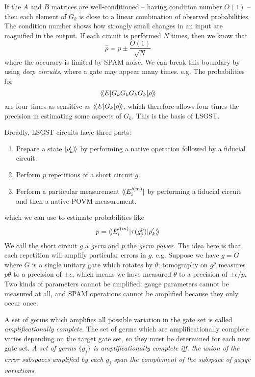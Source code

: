 If the $A$ and $B$ matrices are well-conditioned -- having condition number $O(1)$ -- then each
element of $G_k$ is close to a linear combination of observed probabilities. The condition number
shows how strongly small changes in an input are magnified in the output. If each circuit is
performed $N$ times, then we know that
\begin{equation}
    \hat{p} = p \pm \frac{O(1)}{\sqrt{N}}
\end{equation}
where the accuracy is limited by \ac{SPAM} noise. We can break this boundary by using \textit{deep
circuits}, where a gate may appear many times. e.g. The probabilities for
\begin{equation}
    \langle\!\braket{E | G_k G_k G_k G_k | \rho}\!\rangle
\end{equation}
are four times as sensitive as $\langle\!\braket{E | G_k | \rho}\!\rangle$, which therefore allows four times the
precision in estimating some aspects of $G_k$. This is the basis of \ac{LSGST}.

Broadly, \ac{LSGST} circuits have three parts:
\begin{enumerate}
    \item Prepare a state $\ket{\rho_k'}\!\rangle$ by performing a native operation followed by a
    fiducial circuit.
    \item Perform $p$ repetitions of a short circuit $g$.
    \item Perform a particular measurement $\langle\!\bra{E_i'^{(m)}}$ by performing a fiducial circuit
    and then a native \ac{POVM} measurement.
\end{enumerate}
which we can use to estimate probabilities like
\begin{equation}
    p = \langle\!\braket{E_i'^{(m)} | \tau(g_j^p) | \rho_k'}\!\rangle
\end{equation}
We call the short circuit $g$ a \textit{germ} and $p$ the \textit{germ power}. The idea here is that
each repetition will amplify particular errors in $g$. e.g. Suppose we have $g = G$ where $G$ is a
single unitary gate which rotates by $\theta$; tomography on $g^p$ measures $p\theta$ to a precision
of $\pm \epsilon$, which means we have measured $\theta$ to a precision of $\pm \epsilon / p$. Two
kinds of parameters cannot be amplified: gauge parameters cannot be measured at all, and \ac{SPAM}
operations cannot be amplified because they only occur once.

A set of germs which amplifies all possible variation in the gate set is called
\textit{amplificationally complete}. The set of germs which are amplificationally complete varies
depending on the target gate set, so they must be determined for each new gate set. \textit{A set of
germs $\{g_j\}$ is amplificationally complete iff. the union of the error subspaces amplified by
each $g_j$ span the complement of the subspace of gauge variations}. 

